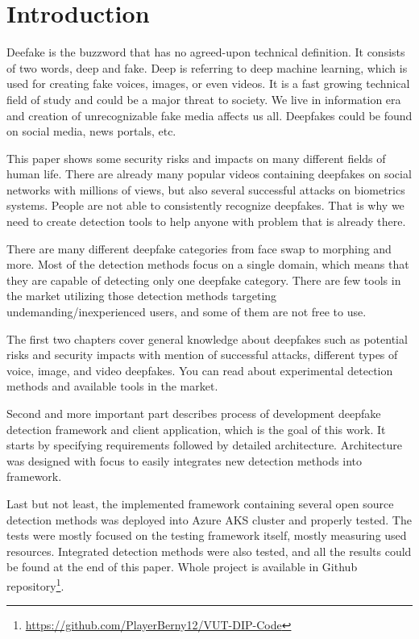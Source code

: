 \chapter{Introduction}

Deefake is the buzzword that has no agreed-upon technical definition. It consists of two words, deep and fake. Deep is referring to deep machine learning, which is used for creating fake voices, images, or even videos. It is a fast growing technical field of study and could be a major threat to society. We live in information era and creation of unrecognizable fake media affects us all. Deepfakes could be found on social media, news portals, etc.

This paper shows some security risks and impacts on many different fields of human life. There are already many popular videos containing deepfakes on social networks with millions of views, but also several successful attacks on biometrics systems. People are not able to consistently recognize deepfakes. That is why we need to create detection tools to help anyone with problem that is already there.

There are many different deepfake categories from face swap to morphing and more. Most of the detection methods focus on a single domain, which means that they are capable of detecting only one deepfake category. There are few tools in the market utilizing those detection methods targeting undemanding/inexperienced users, and some of them are not free to use.

The first two chapters cover general knowledge about deepfakes such as potential risks and security impacts with mention of successful attacks, different types of voice, image, and video deepfakes. You can read about experimental detection methods and available tools in the market.

Second and more important part describes process of development deepfake detection framework and client application, which is the goal of this work. It starts by specifying requirements followed by detailed architecture. Architecture was designed with focus to easily integrates new detection methods into framework.

Last but not least, the implemented framework containing several open source detection methods was deployed into Azure AKS cluster and properly tested. The tests were mostly focused on the testing framework itself, mostly measuring used resources. Integrated detection methods were also tested, and all the results could be found at the end of this paper. Whole project is available in Github repository\footnote{\url{https://github.com/PlayerBerny12/VUT-DIP-Code}}.


